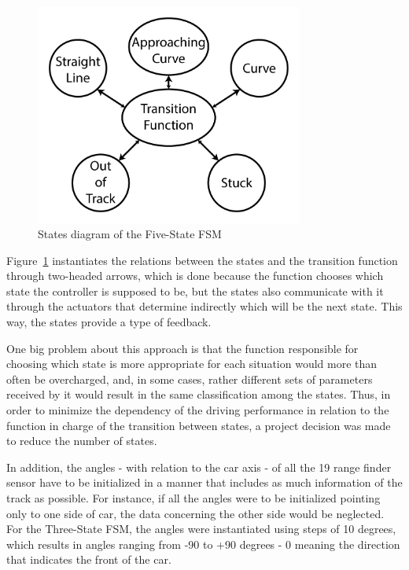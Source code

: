	\begin{figure}[h]
		
		\centering
		\includegraphics[width=250pt]{FiveStateFSM}
		\caption{States diagram of the Five-State FSM}
		\label{Fig:FSM5Diagram}
		
	\end{figure}
	
	Figure~\ref{Fig:FSM5Diagram} instantiates the relations between the states and the transition function through two-headed arrows, which is done because the function chooses which state the controller is supposed to be, but the states also communicate with it through the actuators that determine indirectly which will be the next state. This way, the states provide a type of feedback.
	
	One big problem about this approach is that the function responsible for choosing which state is more appropriate for each situation would more than often be overcharged, and, in some cases, rather different sets of parameters received by it would result in the same classification among the states. Thus, in order to minimize the dependency of the driving performance in relation to the function in charge of the transition between states, a project decision was made to reduce the number of states.
	
	In addition, the angles - with relation to the car axis - of all the 19 range finder sensor have to be initialized in a manner that includes as much information of the track as possible. For instance, if all the angles were to be initialized pointing only to one side of car, the data concerning the other side would be neglected. For the Three-State FSM, the angles were instantiated using steps of 10 degrees, which results in angles ranging from -90 to +90 degrees - 0 meaning the direction that indicates the front of the car.
		
